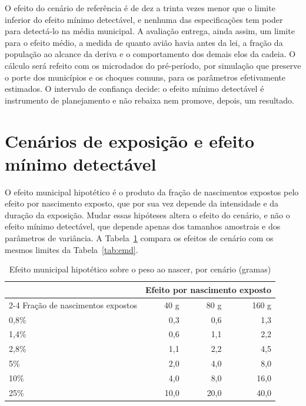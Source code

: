 O efeito do cenário de referência é de dez a trinta vezes menor que o limite
inferior do efeito mínimo detectável, e nenhuma das especificações tem poder
para detectá-lo na média municipal. A avaliação entrega, ainda assim, um limite para o efeito
médio, a medida de quanto avião havia antes da lei, a fração da população ao alcance
da deriva e o comportamento dos demais elos da cadeia. O cálculo será refeito
com os microdados do pré-período, por simulação que preserve o porte dos
municípios e os choques comuns, para os parâmetros efetivamente estimados. O intervalo de confiança decide: o efeito
mínimo detectável é instrumento de planejamento e não rebaixa nem promove,
depois, um resultado.

\section{Cenários de exposição e efeito mínimo detectável}

O efeito municipal hipotético é o produto da fração de nascimentos expostos pelo
efeito por nascimento exposto, que por sua vez depende da intensidade e da
duração da exposição. Mudar essas hipóteses altera o efeito do cenário, e não o
efeito mínimo detectável, que depende apenas dos tamanhos amostrais e dos
parâmetros de variância. A Tabela~\ref{tab:cenarios} compara os efeitos de
cenário com os mesmos limites da Tabela~\ref{tab:emd}.

\begin{table}[ht]
\centering\small
\caption{Efeito municipal hipotético sobre o peso ao nascer, por cenário (gramas)}
\label{tab:cenarios}
\begin{tabular}{@{}lrrr@{}}
\toprule
 & \multicolumn{3}{c}{Efeito por nascimento exposto} \\
\cmidrule(l){2-4}
Fração de nascimentos expostos & 40 g & 80 g & 160 g \\
\midrule
0,8\% & 0,3 & 0,6 & 1,3 \\
1,4\% & 0,6 & 1,1 & 2,2 \\
2,8\% & 1,1 & 2,2 & 4,5 \\
5\%   & 2,0 & 4,0 & 8,0 \\
10\%  & 4,0 & 8,0 & 16,0 \\
25\%  & 10,0 & 20,0 & 40,0 \\
\bottomrule
\end{tabular}
\end{table}

